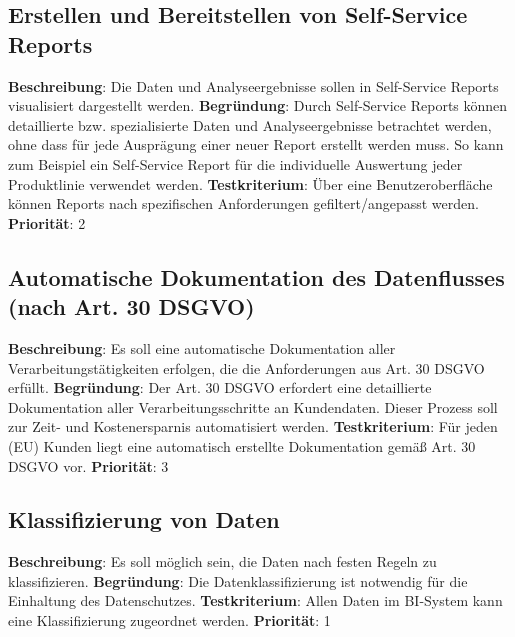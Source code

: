 \subsection{Erstellen und Bereitstellen von Self-Service Reports} \label{sec:anforderungsspezifikation:selfServiceReports}
\textbf{Beschreibung}: Die Daten und Analyseergebnisse sollen in Self-Service Reports visualisiert dargestellt werden.
\newline \textbf{Begründung}: Durch Self-Service Reports können detaillierte bzw. spezialisierte Daten und Analyseergebnisse betrachtet werden, ohne dass für jede Ausprägung einer neuer Report erstellt werden muss. So kann zum Beispiel ein Self-Service Report für die individuelle Auswertung jeder Produktlinie verwendet werden.
\newline \textbf{Testkriterium}: Über eine Benutzeroberfläche können Reports nach spezifischen Anforderungen gefiltert/angepasst werden.
\newline \textbf{Priorität}: 2

\subsection{Automatische Dokumentation des Datenflusses (nach Art. 30 DSGVO)} \label{sec:anforderungsspezifikation:datenflussDokumentation}
\textbf{Beschreibung}: Es soll eine automatische Dokumentation aller Verarbeitungstätigkeiten erfolgen, die die Anforderungen aus Art. 30 DSGVO erfüllt.
\newline \textbf{Begründung}: Der Art. 30 DSGVO erfordert eine detaillierte Dokumentation aller Verarbeitungsschritte an Kundendaten. Dieser Prozess soll zur Zeit- und Kostenersparnis automatisiert werden.
\newline \textbf{Testkriterium}: Für jeden (EU) Kunden liegt eine automatisch erstellte Dokumentation gemäß Art. 30 DSGVO vor.
\newline \textbf{Priorität}: 3

\subsection{Klassifizierung von Daten} \label{sec:anforderungsspezifikation:DatenKlassifizierung}
\textbf{Beschreibung}: Es soll möglich sein, die Daten nach festen Regeln zu klassifizieren. 
\newline \textbf{Begründung}: Die Datenklassifizierung ist notwendig für die Einhaltung des Datenschutzes.
\newline \textbf{Testkriterium}: Allen Daten im BI-System kann eine Klassifizierung zugeordnet werden.
\newline \textbf{Priorität}: 1